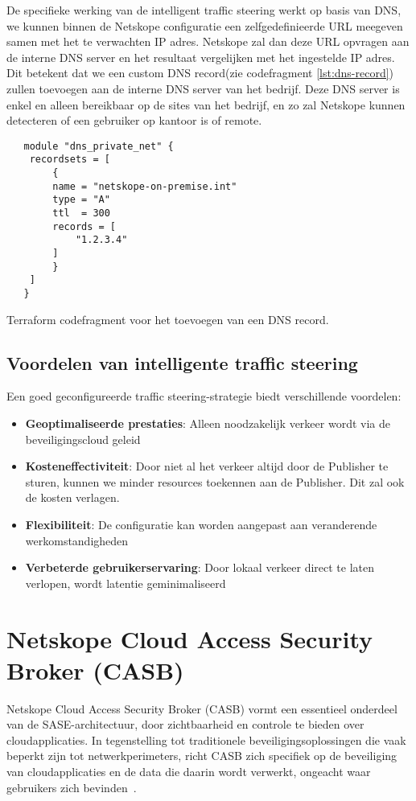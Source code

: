 De specifieke werking van de intelligent traffic steering werkt op basis van DNS, we kunnen binnen de Netskope configuratie een zelfgedefinieerde URL meegeven samen met het te verwachten IP adres. Netskope zal dan deze URL opvragen aan de interne DNS server en het resultaat vergelijken met het ingestelde IP adres. Dit betekent dat we een custom DNS record(zie codefragment \ref{lst:dns-record}) zullen toevoegen aan de interne DNS server van het bedrijf. Deze DNS server is enkel en alleen bereikbaar op de sites van het bedrijf, en zo zal Netskope kunnen detecteren of een gebruiker op kantoor is of remote.
\begin{listing}[H]
  \begin{verbatim}
   module "dns_private_net" {
    recordsets = [
        {
        name = "netskope-on-premise.int"
        type = "A"
        ttl  = 300
        records = [
            "1.2.3.4"
        ]
        }
    ]
   }
  \end{verbatim}
  \caption[Terraform codefragment DNS record]{Terraform codefragment voor het toevoegen van een DNS record.}
    \label{lst:dns-record}
\end{listing}

\subsection{Voordelen van intelligente traffic steering}

Een goed geconfigureerde traffic steering-strategie biedt verschillende voordelen:
\begin{itemize}
    \item \textbf{Geoptimaliseerde prestaties}: Alleen noodzakelijk verkeer wordt via de beveiligingscloud geleid
    \item \textbf{Kosteneffectiviteit}: Door niet al het verkeer altijd door de Publisher te sturen, kunnen we minder resources toekennen aan de Publisher. Dit zal ook de kosten verlagen.
    \item \textbf{Flexibiliteit}: De configuratie kan worden aangepast aan veranderende werkomstandigheden
    \item \textbf{Verbeterde gebruikerservaring}: Door lokaal verkeer direct te laten verlopen, wordt latentie geminimaliseerd
\end{itemize}


\section{Netskope Cloud Access Security Broker (CASB)}
Netskope Cloud Access Security Broker (CASB) vormt een essentieel onderdeel van de SASE-architectuur, door zichtbaarheid en controle te bieden over cloudapplicaties. In tegenstelling tot traditionele beveiligingsoplossingen die vaak beperkt zijn tot netwerkperimeters, richt CASB zich specifiek op de beveiliging van cloudapplicaties en de data die daarin wordt verwerkt, ongeacht waar gebruikers zich bevinden~\autocite{Netskope2025-4}.

